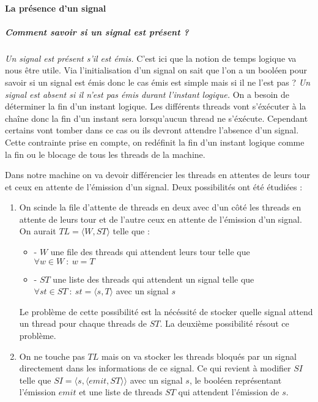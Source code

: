 \documentclass[10pt,a4paper]{article}
\begin{document}
					
				\paragraph{La présence d'un signal}
					
					\subparagraph{Comment savoir si un signal est présent ?}
					\textit{Un signal est présent s'il est émis.}
					\smallbreak
					C'est ici que la notion de temps logique va nous être utile. Via l'initialisation d'un signal on sait que l'on a un booléen pour savoir si un signal est émis donc le cas émis est simple mais si il ne l'est pas ? 
					\smallbreak
					\textit{Un signal est absent si il n'est pas émis durant l'instant logique.}
					\smallbreak
					On a besoin de déterminer la fin d'un instant logique. Les différents threads vont s'éxécuter à la chaîne donc la fin d'un instant sera lorsqu'aucun thread ne s'éxécute. Cependant certains vont tomber dans ce cas ou ils devront attendre l'absence d'un signal. Cette contrainte prise en compte, on redéfinit la fin d'un instant logique comme la fin ou le blocage de tous les threads de la machine.
					\medbreak
						
					Dans notre machine on va devoir différencier les threads en attentes de leurs tour et ceux en attente de l'émission d'un signal. Deux possibilités ont été étudiées :
					\begin{enumerate}
						\item On scinde la file d'attente de threads en deux avec d'un côté les threads en attente de leurs tour et de l'autre ceux en attente de l'émission d'un signal. On aurait $TL =\langle W,ST\rangle$ telle que :
						\begin{itemize}
							\item[] - $W$ une file des threads qui attendent leurs tour telle que $\forall w \in W~:~w = T$ 
							\item[] - $ST$ une liste des threads qui attendent un signal telle que $\forall st \in ST~:~st = \langle s,T\rangle$ avec un signal $s$ 
						\end{itemize}
						\medbreak
							
						Le problème de cette possibilité est la nécéssité de stocker quelle signal attend un thread pour chaque threads de $ST$. La deuxième possibilité résout ce problème.
						\item On ne touche pas $TL$ mais on va stocker les threads bloqués par un signal directement dans les informations de ce signal. Ce qui revient à modifier $SI$ telle que $SI = \langle s , \langle emit , ST \rangle\rangle$ avec un signal $s$, le booléen représentant l'émission $emit$ et une liste de threads $ST$ qui attendent l'émission de $s$.
					\end{enumerate}
					\medbreak
						
\end{document}
